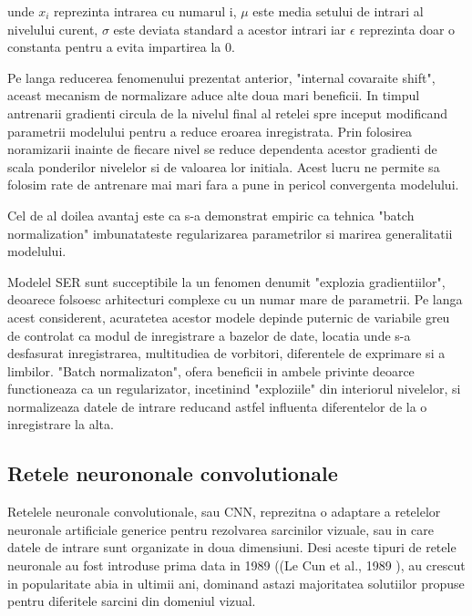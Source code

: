 \documentclass[a4paper,12pt]{book}
\begin{document}
				\quad unde $x_i$ reprezinta intrarea cu numarul i, $\mu$ este media setului de intrari al nivelului curent, $\sigma$ este deviata standard a acestor intrari iar $\epsilon$ reprezinta doar o constanta pentru a evita impartirea la 0.
				
				Pe langa reducerea fenomenului prezentat anterior, "internal covaraite shift", aceast mecanism de normalizare aduce alte doua mari beneficii. In timpul antrenarii gradienti circula de la nivelul final al retelei spre inceput modificand parametrii modelului pentru a reduce eroarea inregistrata.
				Prin folosirea noramizarii inainte de fiecare nivel se reduce dependenta acestor gradienti de scala ponderilor nivelelor si de valoarea lor initiala. Acest lucru ne permite sa folosim rate de antrenare mai mari fara a pune in pericol convergenta modelului. \par
				Cel de al doilea avantaj este ca s-a demonstrat empiric \cite{batch_norm} ca tehnica "batch normalization" imbunatateste regularizarea parametrilor si marirea generalitatii modelului. \par
				Modelel SER sunt succeptibile la un fenomen denumit "explozia gradientiilor", deoarece folsoesc arhitecturi complexe cu un numar mare de parametrii. Pe langa acest considerent, acuratetea acestor modele depinde puternic de variabile greu de controlat ca modul de inregistrare a bazelor de date, locatia unde s-a desfasurat inregistrarea, multitudiea de vorbitori, diferentele de exprimare si a limbilor. "Batch normalizaton", ofera beneficii in ambele privinte deoarce functioneaza ca un regularizator, incetinind "exploziile" din interiorul nivelelor, si normalizeaza datele de intrare reducand astfel influenta diferentelor de la o inregistrare la alta. \par
			\subsection{Retele neurononale convolutionale} \label{cnns}
				Retelele neuronale convolutionale, sau CNN, reprezitna o adaptare a retelelor neuronale artificiale generice pentru rezolvarea sarcinilor vizuale, sau in care datele de intrare sunt organizate in doua dimensiuni. Desi aceste tipuri de retele neuronale au fost introduse prima data in 1989 ((Le Cun et al., 1989 \cite{leCun}), au crescut in popularitate abia in ultimii ani, dominand astazi majoritatea solutiilor propuse pentru diferitele sarcini din domeniul vizual. \par 
				
\end{document}
